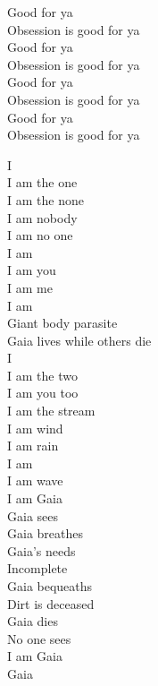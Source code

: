 Good for ya\\
Obsession is good for ya\\
Good for ya\\
Obsession is good for ya\\
Good for ya\\
Obsession is good for ya\\
Good for ya\\
Obsession is good for ya\\




I\\
I am the one\\
I am the none\\
I am nobody\\
I am no one\\
I am \\
I am you\\
I am me\\
I am \\

Giant body parasite\\
Gaia lives while others die\\

I\\
I am the two\\
I am you too\\
I am the stream\\
I am wind\\
I am rain\\
I am \\
I am wave\\
I am Gaia\\

Gaia sees\\
Gaia breathes\\
Gaia's needs\\
Incomplete\\
Gaia bequeaths\\
Dirt is deceased\\
Gaia dies\\
No one sees\\

I am Gaia\\

Gaia\\

